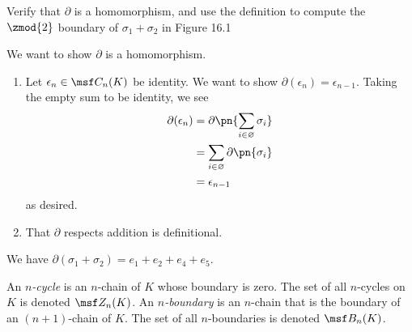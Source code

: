 \begin{problem}[16.2]
  Verify that $\partial$ is a homomorphism, and use the definition to compute
  the $\zmod{2}$ boundary of $\sigma_1 + \sigma_2$ in Figure 16.1
\end{problem}
\begin{solution}
  We want to show $\partial$ is a homomorphism.
  \begin{enumerate}
    \item Let $\epsilon_n \in \msf C_n(K)$ be identity. We want to show
      $\partial(\epsilon_n) = \epsilon_{n-1}$. Taking the empty sum to be
      identity, we see
      \begin{align*}
        \partial(\epsilon_n)
        &=
        \partial\pn{\sum_{i\in \varnothing} \sigma_i} \\
        &= \sum_{i\in\varnothing} \partial\pn{\sigma_i} \\
        &= \epsilon_{n-1}
      \end{align*}
      as desired.
    \item That $\partial$ respects addition is definitional.
  \end{enumerate}
  We have $\partial(\sigma_1 + \sigma_2) = e_1 + e_2 + e_4 + e_5$.
\end{solution}
\begin{definition}
  An \emph{$n$-cycle} is an $n$-chain of $K$ whose boundary is zero. The set of
  all $n$-cycles on $K$ is denoted $\msf Z_n(K)$. An \emph{$n$-boundary} is an
  $n$-chain that is the boundary of an $(n+1)$-chain of $K$. The set of all
  $n$-boundaries is denoted $\msf B_n(K)$.
\end{definition}

